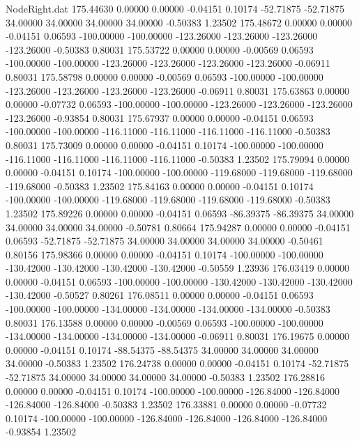 \begin{filecontents}{NodeRight.dat}
 175.44630    0.00000    0.00000    -0.04151    0.10174  -52.71875  -52.71875   34.00000   34.00000   34.00000   34.00000   -0.50383    1.23502
 175.48672    0.00000    0.00000    -0.04151    0.06593 -100.00000 -100.00000 -123.26000 -123.26000 -123.26000 -123.26000   -0.50383    0.80031
 175.53722    0.00000    0.00000    -0.00569    0.06593 -100.00000 -100.00000 -123.26000 -123.26000 -123.26000 -123.26000   -0.06911    0.80031
 175.58798    0.00000    0.00000    -0.00569    0.06593 -100.00000 -100.00000 -123.26000 -123.26000 -123.26000 -123.26000   -0.06911    0.80031
 175.63863    0.00000    0.00000    -0.07732    0.06593 -100.00000 -100.00000 -123.26000 -123.26000 -123.26000 -123.26000   -0.93854    0.80031
 175.67937    0.00000    0.00000    -0.04151    0.06593 -100.00000 -100.00000 -116.11000 -116.11000 -116.11000 -116.11000   -0.50383    0.80031
 175.73009    0.00000    0.00000    -0.04151    0.10174 -100.00000 -100.00000 -116.11000 -116.11000 -116.11000 -116.11000   -0.50383    1.23502
 175.79094    0.00000    0.00000    -0.04151    0.10174 -100.00000 -100.00000 -119.68000 -119.68000 -119.68000 -119.68000   -0.50383    1.23502
 175.84163    0.00000    0.00000    -0.04151    0.10174 -100.00000 -100.00000 -119.68000 -119.68000 -119.68000 -119.68000   -0.50383    1.23502
 175.89226    0.00000    0.00000    -0.04151    0.06593  -86.39375  -86.39375   34.00000   34.00000   34.00000   34.00000   -0.50781    0.80664
 175.94287    0.00000    0.00000    -0.04151    0.06593  -52.71875  -52.71875   34.00000   34.00000   34.00000   34.00000   -0.50461    0.80156
 175.98366    0.00000    0.00000    -0.04151    0.10174 -100.00000 -100.00000 -130.42000 -130.42000 -130.42000 -130.42000   -0.50559    1.23936
 176.03419    0.00000    0.00000    -0.04151    0.06593 -100.00000 -100.00000 -130.42000 -130.42000 -130.42000 -130.42000   -0.50527    0.80261
 176.08511    0.00000    0.00000    -0.04151    0.06593 -100.00000 -100.00000 -134.00000 -134.00000 -134.00000 -134.00000   -0.50383    0.80031
 176.13588    0.00000    0.00000    -0.00569    0.06593 -100.00000 -100.00000 -134.00000 -134.00000 -134.00000 -134.00000   -0.06911    0.80031
 176.19675    0.00000    0.00000    -0.04151    0.10174  -88.54375  -88.54375   34.00000   34.00000   34.00000   34.00000   -0.50383    1.23502
 176.24738    0.00000    0.00000    -0.04151    0.10174  -52.71875  -52.71875   34.00000   34.00000   34.00000   34.00000   -0.50383    1.23502
 176.28816    0.00000    0.00000    -0.04151    0.10174 -100.00000 -100.00000 -126.84000 -126.84000 -126.84000 -126.84000   -0.50383    1.23502
 176.33881    0.00000    0.00000    -0.07732    0.10174 -100.00000 -100.00000 -126.84000 -126.84000 -126.84000 -126.84000   -0.93854    1.23502

\end{filecontents}
